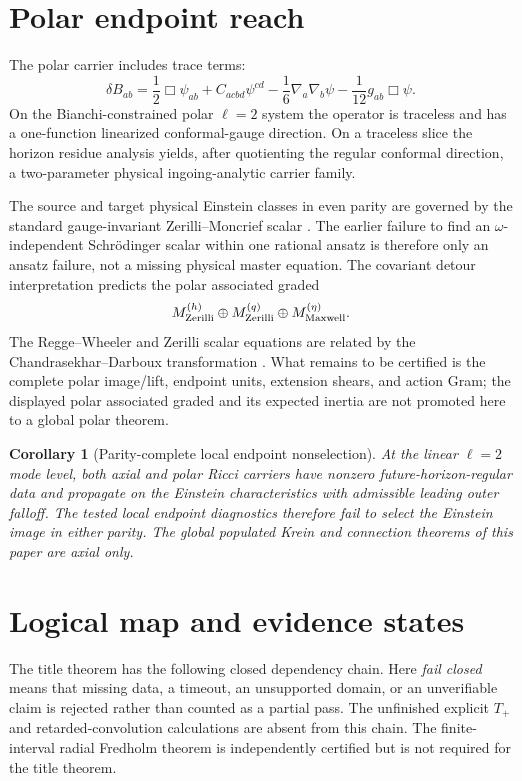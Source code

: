 \documentclass[11pt]{article}
\newtheorem{corollary}[theorem]{Corollary}
\theoremstyle{definition}
\theoremstyle{remark}
\begin{document}
\section{Polar endpoint reach}

The polar carrier includes trace terms:
\begin{equation}
\delta B_{ab}
=\frac12\Box\psi_{ab}+C_{acbd}\psi^{cd}
-\frac16\nabla_a\nabla_b\psi
-\frac1{12}g_{ab}\Box\psi.
\end{equation}
On the Bianchi-constrained polar \(\ell=2\) system the operator is traceless
and has a one-function linearized conformal-gauge direction.  On a traceless
slice the horizon residue analysis yields, after quotienting the regular
conformal direction, a two-parameter physical ingoing-analytic carrier
family.

The source and target physical Einstein classes in even parity are governed
by the standard gauge-invariant Zerilli--Moncrief scalar
\cite{MartelPoisson}.  The earlier failure to find an
\(\omega\)-independent Schr\"odinger scalar within one rational ansatz is
therefore only an ansatz failure, not a missing physical master equation.
The covariant detour interpretation predicts the polar associated graded
\[
M_{\rm Zerilli}^{(h)}
\oplus M_{\rm Zerilli}^{(q)}
\oplus M_{\rm Maxwell}^{(\eta)}.
\]
The Regge--Wheeler and Zerilli scalar equations are related by the
Chandrasekhar--Darboux transformation \cite{DarbouxBH}.  What remains to be
certified is the complete polar image/lift, endpoint units, extension shears,
and action Gram; the displayed polar associated graded and its expected
inertia are not promoted here to a global polar theorem.

\begin{corollary}[Parity-complete local endpoint nonselection]
At the linear \(\ell=2\) mode level, both axial and polar Ricci carriers have
nonzero future-horizon-regular data and propagate on the Einstein
characteristics with admissible leading outer falloff.  The tested local
endpoint diagnostics therefore fail to select the Einstein image in either
parity.  The global populated Krein and connection theorems of this paper are
axial only.
\end{corollary}

\section{Logical map and evidence states}

The title theorem has the following closed dependency chain.  Here
\emph{fail closed} means that missing data, a timeout, an unsupported domain,
or an unverifiable claim is rejected rather than counted as a partial pass.
The unfinished explicit \(T_+\) and retarded-convolution calculations are
absent from this chain.  The finite-interval radial Fredholm theorem is
independently certified but is not required for the title theorem.
\end{document}
